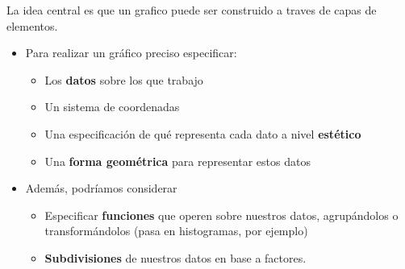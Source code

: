\documentclass[
  10pt,
  ignorenonframetext,
]{beamer}
\providecommand{\tightlist}{%
  \setlength{\itemsep}{0pt}\setlength{\parskip}{0pt}}
\begin{document}
\begin{frame}{}
\protect\hypertarget{section-4}{}

La idea central es que un grafico puede ser construido a traves de capas
de elementos.

\begin{itemize}
\item
  Para realizar un gráfico preciso especificar:

  \begin{itemize}
  \tightlist
  \item
    Los \textbf{datos} sobre los que trabajo \vspace{10pt}
  \item
    Un sistema de coordenadas \vspace{10pt}
  \item
    Una especificación de qué representa cada dato a nivel
    \textbf{estético} \vspace{10pt}
  \item
    Una \textbf{forma geométrica} para representar estos datos
    \vspace{10pt}
  \end{itemize}
\item
  Además, podríamos considerar

  \begin{itemize}
  \tightlist
  \item
    Especificar \textbf{funciones} que operen sobre nuestros datos,
    agrupándolos o transformándolos (pasa en histogramas, por ejemplo)
    \vspace{10pt}
  \item
    \textbf{Subdivisiones} de nuestros datos en base a factores.
    \vspace{10pt}
  \end{itemize}
\end{itemize}
\end{frame}
\end{document}

